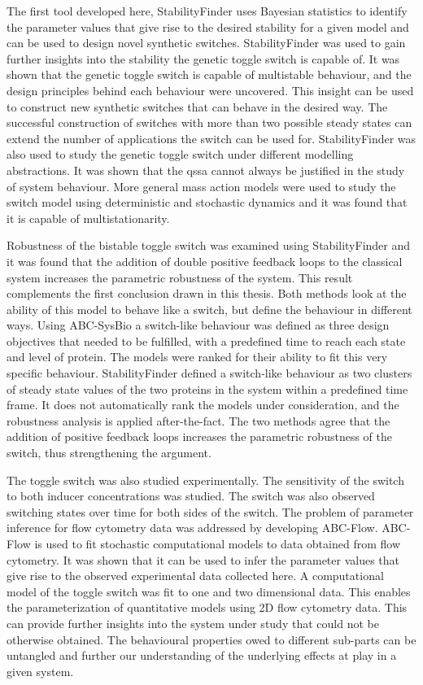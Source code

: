The first tool developed here, StabilityFinder uses Bayesian statistics to identify the parameter values that give rise to the desired stability for a given model and can be used to design novel synthetic switches. StabilityFinder was used to gain further insights into the stability the genetic toggle switch is capable of. It was shown that the genetic toggle switch is capable of multistable behaviour, and the design principles behind each behaviour were uncovered. This insight can be used to construct new synthetic switches that can behave in the desired way. The successful construction of switches with more than two possible steady states can extend the number of applications the switch can be used for. StabilityFinder was also used to study the genetic toggle switch under different modelling abstractions. It was shown that the \acrshort{qssa} cannot always be justified in the study of system behaviour. More general mass action models were used to study the switch model using deterministic and stochastic dynamics and it was found that it is capable of multistationarity. 

Robustness of the bistable toggle switch was examined using StabilityFinder and it was found that the addition of double positive feedback loops to the classical system increases the parametric robustness of the system. This result complements the first conclusion drawn in this thesis. Both methods look at the ability of this model to behave like a switch, but define the behaviour in different ways. Using ABC-SysBio a switch-like behaviour was defined as three design objectives that needed to be fulfilled, with a predefined time to reach each state and level of protein. The models were ranked for their ability to fit this very specific behaviour. StabilityFinder defined a switch-like behaviour as two clusters of steady state values of the two proteins in the system within a predefined time frame. It does not automatically rank the models under consideration, and the robustness analysis is applied after-the-fact. The two methods agree that the addition of positive feedback loops increases the parametric robustness of the switch, thus strengthening the argument.  

The toggle switch was also studied experimentally. The sensitivity of the switch to both inducer concentrations was studied. The switch was also observed switching states over time for both sides of the switch. The problem of parameter inference for flow cytometry data was addressed by developing ABC-Flow.  ABC-Flow is used to fit stochastic computational models to data obtained from flow cytometry. It was shown that it can be used to infer the parameter values that give rise to the observed experimental data collected here. A computational model of the toggle switch was fit to one and two dimensional data. This enables the parameterization of quantitative models using 2D flow cytometry data. This can provide further insights into the system under study that could not be otherwise obtained. The behavioural properties owed to different sub-parts can be untangled and further our understanding of the underlying effects at play in a given system.

